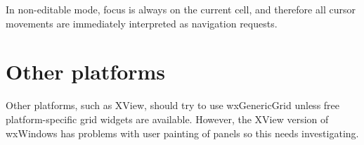 In non-editable mode, focus is always on the current cell, and therefore all cursor movements
are immediately interpreted as navigation requests.

\section{Other platforms}

Other platforms, such as XView, should try to use wxGenericGrid
unless free platform-specific grid widgets are available.
However, the XView version of wxWindows has problems with user painting
of panels so this needs investigating.
